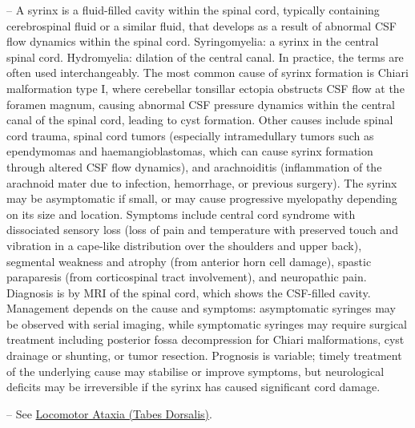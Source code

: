 -- A syrinx is a fluid-filled cavity within the spinal cord, typically containing cerebrospinal fluid or a similar fluid, that develops as a result of abnormal CSF flow dynamics within the spinal cord. Syringomyelia: a syrinx in the central spinal cord. Hydromyelia: dilation of the central canal. In practice, the terms are often used interchangeably. The most common cause of syrinx formation is Chiari malformation type I, where cerebellar tonsillar ectopia obstructs CSF flow at the foramen magnum, causing abnormal CSF pressure dynamics within the central canal of the spinal cord, leading to cyst formation. Other causes include spinal cord trauma, spinal cord tumors (especially intramedullary tumors such as ependymomas and haemangioblastomas, which can cause syrinx formation through altered CSF flow dynamics), and arachnoiditis (inflammation of the arachnoid mater due to infection, hemorrhage, or previous surgery). The syrinx may be asymptomatic if small, or may cause progressive myelopathy depending on its size and location. Symptoms include central cord syndrome with dissociated sensory loss (loss of pain and temperature with preserved touch and vibration in a cape-like distribution over the shoulders and upper back), segmental weakness and atrophy (from anterior horn cell damage), spastic paraparesis (from corticospinal tract involvement), and neuropathic pain. Diagnosis is by MRI of the spinal cord, which shows the CSF-filled cavity. Management depends on the cause and symptoms: asymptomatic syringes may be observed with serial imaging, while symptomatic syringes may require surgical treatment including posterior fossa decompression for Chiari malformations, cyst drainage or shunting, or tumor resection. Prognosis is variable; timely treatment of the underlying cause may stabilise or improve symptoms, but neurological deficits may be irreversible if the syrinx has caused significant cord damage.

-- See \hyperlink{Locomotor Ataxia (Tabes Dorsalis)}{Locomotor Ataxia (Tabes Dorsalis)}.

